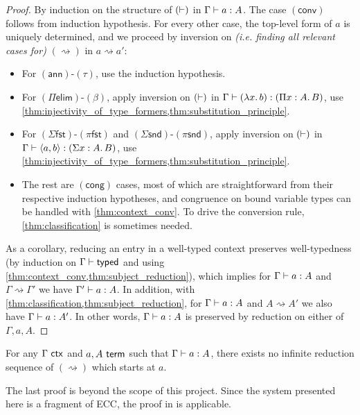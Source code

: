 \documentclass[twoside]{report}
\begin{document}
\begin{proof}
By induction on the structure of $(\vdash)$ in $\Gamma \vdash a : A$. The case $(\mathsf{conv})$ follows from induction hypothesis. For every other case, the top-level form of $a$ is uniquely determined, and we proceed by inversion on \emph{(i.e. finding all relevant cases for)} $(\rightsquigarrow)$ in $a \rightsquigarrow a'$:
\begin{itemize}[noitemsep]
    \item For $(\mathsf{ann})$-$(\tau)$, use the induction hypothesis.
    \item For $(\Pi\mathsf{elim})$-$(\mathsf{\beta})$, apply inversion on $(\vdash)$ in $\Gamma \vdash (\lambda{x}.\,{b}) : (\Pi{x} : {A}.\,{B})$, use \cref{thm:injectivity_of_type_formers,thm:substitution_principle}.
    \item For $(\Sigma\mathsf{fst})$-$(\mathsf{\pi{fst}})$ and $(\Sigma\mathsf{snd})$-$(\mathsf{\pi{snd}})$, apply inversion on $(\vdash)$ in $\Gamma \vdash \langle{a}, {b}\rangle : (\Sigma{x} : {A}.\,{B})$, use \cref{thm:injectivity_of_type_formers,thm:substitution_principle}.
    \item The rest are $(\mathsf{cong})$ cases, most of which are straightforward from their respective induction hypotheses, and congruence on bound variable types can be handled with \cref{thm:context_conv}. To drive the conversion rule, \cref{thm:classification} is sometimes needed.
\end{itemize}
As a corollary, reducing an entry in a well-typed context preserves well-typedness (by induction on $\Gamma \vdash \mathsf{typed}$ and using \cref{thm:context_conv,thm:subject_reduction}), which implies for $\Gamma \vdash a : A$ and $\Gamma \rightsquigarrow \Gamma'$ we have $\Gamma' \vdash a : A$. In addition, with \cref{thm:classification,thm:subject_reduction}, for $\Gamma \vdash a : A$ and $A \rightsquigarrow A'$ we also have $\Gamma \vdash a : A'$. In other words, $\Gamma \vdash a : A$ is preserved by reduction on either of $\Gamma, a, A$.
\end{proof}

\begin{proposition}
\label{thm:red_termination}
For any $\Gamma \ \mathsf{ctx}$ and $a,A \ \mathsf{term}$ such that $\Gamma \vdash a : A$, there exists no infinite reduction sequence of $(\rightsquigarrow)$ which starts at $a$.
\end{proposition}

The last proof is beyond the scope of this project. Since the system presented here is a fragment of ECC, the proof in \cite{luo1990extended} is applicable.
\end{document}
